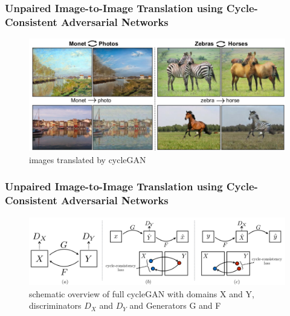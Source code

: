 \documentclass{beamer}
\begin{document}
\begin{frame}
\frametitle{Unpaired Image-to-Image Translation	using Cycle-Consistent Adversarial Networks}
\cite{ui2i}
\begin{figure}
	\includegraphics[width=0.9\linewidth]{../images/ui2i.png}
	\caption{images translated by cycleGAN}
\end{figure}
\end{frame}

\begin{frame}
\frametitle{Unpaired Image-to-Image Translation	using Cycle-Consistent Adversarial Networks}
\cite{ui2i}
\begin{figure}
	\includegraphics[width=\linewidth]{../images/ui2i_cycleGAN.png}
	\caption{schematic overview of full cycleGAN with domains X and Y, discriminators $D_X$ and $D_Y$ and Generators G and F}
\end{figure}
\end{frame}

%
%
%
%
%
\end{document}
